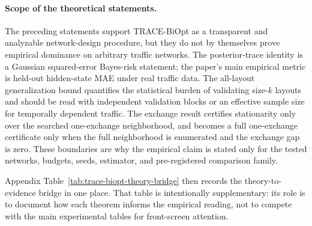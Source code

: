 \paragraph{Scope of the theoretical statements.}
The preceding statements support TRACE-BiOpt as a transparent and analyzable network-design procedure, but they do not by themselves prove empirical dominance on arbitrary traffic networks. The posterior-trace identity is a Gaussian squared-error Bayes-risk statement; the paper's main empirical metric is held-out hidden-state MAE under real traffic data. The all-layout generalization bound quantifies the statistical burden of validating size-$k$ layouts and should be read with independent validation blocks or an effective sample size for temporally dependent traffic. The exchange result certifies stationarity only over the searched one-exchange neighborhood, and becomes a full one-exchange certificate only when the full neighborhood is enumerated and the exchange gap is zero. These boundaries are why the empirical claim is stated only for the tested networks, budgets, seeds, estimator, and pre-registered comparison family.

Appendix Table~\ref{tab:trace-biopt-theory-bridge} then records the
theory-to-evidence bridge in one place. That table is intentionally
supplementary: its role is to document how each theorem informs the empirical
reading, not to compete with the main experimental tables for front-screen
attention.
